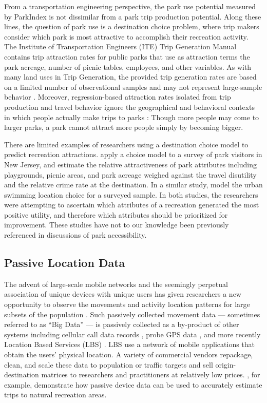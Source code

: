 \documentclass[]{elsarticle} %
\begin{document}
From a transportation engineering perspective, the park use potential measured
by ParkIndex is not dissimilar from a park trip production potential. Along
these lines, the question of park use is a destination choice problem, where
trip makers consider which park is most attractive to accomplish their
recreation activity. The Institute of Transportation Engineers (ITE) Trip
Generation Manual \citeyearpar{ite2019} contains trip attraction rates for public parks
that use as attraction terms the park acreage, number of picnic tables,
employees, and other variables. As with many land uses in Trip Generation, the
provided trip generation rates are based on a limited number of observational
samples and may not represent large-sample behavior \citep{Millard-Ball2015}.
Moreover, regression-based attraction rates isolated from trip production and
travel behavior ignore the geographical and behavioral contexts in which people
actually make trips to parks \citep{Barnard1987}: Though more people may come to
larger parks, a park cannot attract more people simply by becoming bigger.

There are limited examples of researchers using a destination choice model to
predict recreation attractions. \citet{Kinnell2006} apply a choice model to a survey
of park visitors in New Jersey, and estimate the relative attractiveness of park
attributes including playgrounds, picnic areas, and park acreage weighed against
the travel disutility and the relative crime rate at the destination. In a
similar study, \citet{Meyerhoff2010} model the urban swimming location choice for a
surveyed sample. In both studies, the researchers were attempting to ascertain
which attributes of a recreation generated the most positive utility, and
therefore which attributes should be prioritized for improvement. These studies
have not to our knowledge been previously referenced in discussions of park
accessibility.

\hypertarget{passive-location-data}{%
\subsection{Passive Location Data}\label{passive-location-data}}

The advent of large-scale mobile networks and the seemingly perpetual
association of unique devices with unique users has given researchers a new
opportunity to observe the movements and activity location patterns for large
subsets of the population \citep{Naboulsi2016}. Such passively collected movement
data --- sometimes referred to as ``Big Data'' --- is passively collected as a
by-product of other systems including cellular call data records \citep[e.g.,][]{Bolla2000, Calabrese2011}, probe GPS data \citep{Huang2015}, and more recently
Location Based Services (LBS) \citep{Roll2019, Komanduri2017}. LBS use a network of
mobile applications that obtain the users' physical location. A variety of
commercial vendors repackage, clean, and scale these data to population or
traffic targets and sell origin-destination matrices to researchers and
practitioners at relatively low prices. \citet{Monz2019}, for example, demonstrate
how passive device data can be used to accurately estimate trips to natural
recreation areas.
\end{document}

